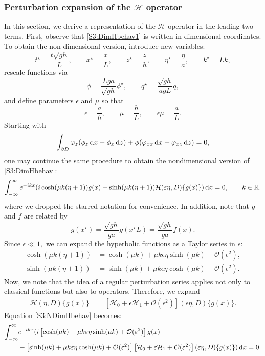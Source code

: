 \documentclass[11pt,reqno,oneside,a4paper]{article}
\begin{document}
\subsubsection{Perturbation expansion of the $\mathcal{H}$ operator}
In this section, we derive a representation of the $\mathcal{H}$ operator in the leading two terms. First, observe that \eqref{S3:DimHbehav1} is written in dimensional coordinates. To obtain the non-dimensional version, introduce new variables: 
\[ 
t^{\star} = \frac{t \sqrt{gh}}{L}, \qquad x^{\star}  = \frac{x}{L}, \qquad z^{\star}  = \frac{z}{h}, \qquad \eta^{\star}  = \frac{\eta}{a}, \qquad k^{\star}  = Lk, \]
rescale functions via
\[ \phi = \frac{Lga}{\sqrt{gh}} \phi^{\star}, \qquad q^{\star}  = \frac{\sqrt{gh}}{agL} q,\]
and define parameters $\epsilon$ and $\mu$ so that
\[ 
\epsilon = \frac{a}{h}, \qquad \mu = \frac{h}{L}, \qquad \epsilon \mu = \frac{a}{L}.
\] 
Starting with 
\begin{equation*}
\int_{\partial D} \varphi_z(\phi_z \,\mathrm{d} x - \phi_x \,\mathrm{d} z) + \phi(\varphi_{xx} \,\mathrm{d} x + \varphi_{xz} \,\mathrm{d} z) = 0,
\end{equation*}
one may continue the same procedure to obtain the nondimensional version of \eqref{S3:DimHbehav}:
\begin{equation}\label{S3:NDimHbehav}
\int_{-\infty}^{\infty} e^{-ikx}( i  \cosh(\mu k(\eta+1)) g(x) - \sinh(\mu k(\eta+1)) \mathcal{H}( \varepsilon \eta, D)\{ g(x) \}) \,\mathrm{d} x = 0, \qquad k \in \mathbb R.
\end{equation}
where we dropped the starred notation for convenience. In addition, note that $g$ and $f$ are related by 
\[ g(x^{\star}) = \frac{\sqrt{gh}}{ga}g(x^{\star}L) = \frac{\sqrt{gh}}{ga}f(x).
\]
Since $\epsilon \ll 1,$ we can expand the hyperbolic functions as a Taylor series in $\epsilon:$
\begin{align*}
\cosh(\mu k(\eta+1)) &= \cosh(\mu k) + \mu k \epsilon \eta \sinh(\mu k) + \mathcal{O}(\epsilon^2), \\
\sinh(\mu k(\eta+1)) &= \sinh(\mu k) + \mu k \epsilon \eta \cosh(\mu k) + \mathcal{O}(\epsilon^2).
\end{align*}
Now, we note that the idea of a regular perturbation series applies not only to classical functions but also to operators. Therefore, we expand
\begin{align*}
\mathcal{H}( \eta, D)\{ g(x) \} &= \left[\mathcal{H}_0 + \epsilon \mathcal{H}_1 + \mathcal{O}(\epsilon^2) \right]( \epsilon\eta, D)\{ g(x) \}.
\end{align*}
Equation \eqref{S3:NDimHbehav} becomes:
\begin{equation}\label{S3:HPerturbed}
\begin{aligned}
\int_{-\infty}^{\infty} &e^{-ikx}( i \left[ \cosh(\mu k) + \mu k \varepsilon \eta \sinh(\mu k) + \mathcal{O}(\varepsilon^2) \right] g(x) \\
&- \left[ \sinh(\mu k) + \mu k \varepsilon \eta \cosh(\mu k) + \mathcal{O}(\varepsilon^2)\right] \left[ \mathcal{H}_0 + \varepsilon \mathcal{H}_1 + \mathcal{O}(\varepsilon^2) \right]( \varepsilon \eta, D)\{ g(x) \}) \,\mathrm{d} x = 0.
\end{aligned}
\end{equation}
\end{document}
